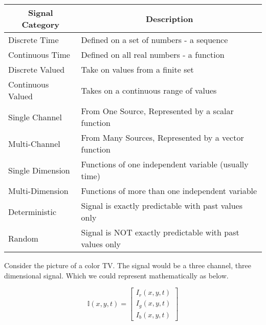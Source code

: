 \begin{fullwidth}
\begin{table}[h]
	\begin{tabular}{@{}ll@{}}
		\toprule
		\multicolumn{1}{c}{Signal Category} & \multicolumn{1}{c}{Description} \\ \midrule
		Discrete Time                                               & Defined on a set of numbers - a sequence                \\
		Continuous Time                                             & Defined on all real numbers - a function                \\ \midrule
		Discrete Valued                                             & Take on values from a finite set                        \\
		Continuous Valued                                           & Takes on a continuous range of values                   \\ \midrule
		Single Channel                                              & From One Source, Represented by a scalar function       \\
		Multi-Channel                                               & From Many Sources, Represented by a vector function     \\ \midrule
		Single Dimension                                            & Functions of one independent variable (usually time)    \\
		Multi-Dimension                                             & Functions of more than one independent variable         \\ \midrule
		Deterministic                                               & Signal is exactly predictable with past values only     \\
		Random                                                      & Signal is NOT exactly predictable with past values only \\ \bottomrule
	\end{tabular}
\end{table}
\end{fullwidth}
\vspace{2em}
Consider the picture of a color TV. The signal would be a three channel, three dimensional signal. Which we could represent mathematically as below.

\begin{displaymath}
	\mathbb{I}\left( x,y,t \right) = \begin{bmatrix}
		I_r\left(x,y,t\right) \\ I_g\left(x,y,t\right) \\ I_b\left(x,y,t\right)
	\end{bmatrix}
\end{displaymath}